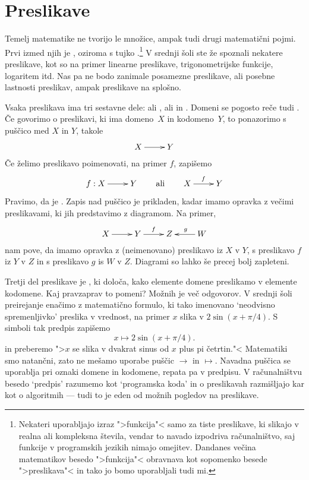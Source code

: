 \section{Preslikave}

Temelj matematike ne tvorijo le množice, ampak tudi drugi matematični pojmi. Prvi izmed
njih je , oziroma s tujko .\footnote{Nekateri uporabljajo
  izraz ">funkcija"< samo za tiste preslikave, ki slikajo v realna ali kompleksna števila,
  vendar to navado izpodriva računalništvo, saj funkcije v programskih jezikih nimajo
  omejitev. Dandanes večina matematikov besedo ">funkcija"< obravnava kot sopomenko besede
  ">preslikava"< in tako jo bomo uporabljali tudi mi.} V srednji šoli ste že spoznali
nekatere preslikave, kot so na primer linearne preslikave, trigonometrijske funkcije,
logaritem itd. Nas pa ne bodo zanimale posamezne preslikave, ali posebne lastnosti
preslikav, ampak preslikave na splošno.

Vsaka preslikava ima tri sestavne dele:  ali ,
 ali  in . Domeni se pogosto reče tudi
. Če govorimo o preslikavi, ki ima domeno~$X$ in kodomeno~$Y$, to
ponazorimo s puščico med $X$ in $Y$, takole
%
\begin{equation*}
  \xymatrix{
    {X} \ar[r] &
    {Y}
  }
\end{equation*}
%
Če želimo preslikavo poimenovati, na primer $f$, zapišemo
%
\begin{equation*}
  \xymatrix{
   {f : X} \ar[r] &
    {Y}
  }
  \qquad\text{ali}\qquad
  \xymatrix{
   {X} \ar[r]^{f} &
   {Y}
  }
\end{equation*}
%
Pravimo, da je . Zapis nad puščico je prikladen, kadar
imamo opravka z večimi preslikavami, ki jih predstavimo z diagramom. Na primer,
%
\begin{equation*}
  \xymatrix{
    {X} \ar[r] &
    {Y} \ar[r]^{f} &
    {Z}  &
    {W} \ar[l]_{g}
  }
\end{equation*}
%
nam pove, da imamo opravka z (neimenovano) preslikavo iz $X$ v $Y$, s preslikavo $f$ iz
$Y$ v $Z$ in s preslikavo $g$ is $W$ v $Z$. Diagrami so lahko še precej bolj zapleteni.

Tretji del preslikave je , ki določa, kako elemente domene preslikamo v elemente
kodomene. Kaj pravzaprav to pomeni? Možnih je več odgovorov. V srednji šoli preirejanje
enačimo z matematično formulo, ki tako imenovano `neodvisno spremenljivko' preslika v vrednost, na primer $x$ slika v
$2 \sin(x + \pi/4)$. S simboli tak predpis zapišemo
%
\begin{equation*}
  x \mapsto 2 \sin(x + \pi/4).
\end{equation*}
%
in preberemo ">$x$ se slika v dvakrat sinus od $x$ plus pi četrtin."<
%
Matematiki smo natančni, zato ne mešamo uporabe puščic $\to$ in $\mapsto$. Navadna puščica
se uporablja pri oznaki domene in kodomene, repata pa v predpisu. V računalništvu besedo
`predpis' razumemo kot `programska koda' in o preslikavah razmišljajo kar kot o
algoritmih --- tudi to je eden od možnih pogledov na preslikave.

